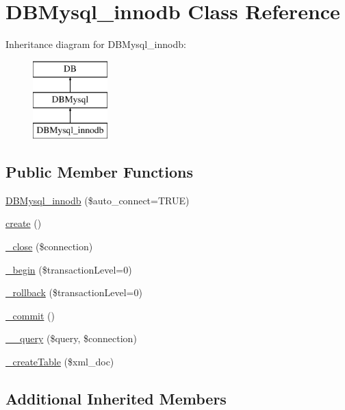 \hypertarget{classDBMysql__innodb}{}\section{D\+B\+Mysql\+\_\+innodb Class Reference}
\label{classDBMysql__innodb}
Inheritance diagram for D\+B\+Mysql\+\_\+innodb\+:\begin{figure}[H]
\begin{center}
\leavevmode
\includegraphics[height=3.000000cm]{classDBMysql__innodb}
\end{center}
\end{figure}
\subsection*{Public Member Functions}
\begin{DoxyCompactItemize}
\item 
\hyperlink{classDBMysql__innodb_a427178f2ed07dbec683c2de9d0be925d}{D\+B\+Mysql\+\_\+innodb} (\$auto\+\_\+connect=T\+R\+UE)
\item 
\hyperlink{classDBMysql__innodb_ac00d0e52855fb50fc453dd78367de102}{create} ()
\item 
\hyperlink{classDBMysql__innodb_a006f982aef8b7fd2909d3912e0afb032}{\+\_\+close} (\$connection)
\item 
\hyperlink{classDBMysql__innodb_a12c61046869744bc9df72753d6ca8348}{\+\_\+begin} (\$transaction\+Level=0)
\item 
\hyperlink{classDBMysql__innodb_a36779df768253f967560eee5a8c1ae89}{\+\_\+rollback} (\$transaction\+Level=0)
\item 
\hyperlink{classDBMysql__innodb_a9ffbd5a0d262ae7dd7fb840822a7e543}{\+\_\+commit} ()
\item 
\hyperlink{classDBMysql__innodb_a12af9ec87d5f630d282c2bc2571ee5fe}{\+\_\+\+\_\+query} (\$query, \$connection)
\item 
\hyperlink{classDBMysql__innodb_aa2b634992fbfaaadea5c897b8810b87c}{\+\_\+create\+Table} (\$xml\+\_\+doc)
\end{DoxyCompactItemize}
\subsection*{Additional Inherited Members}


